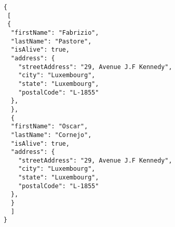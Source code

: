 \begin{minipage}{14cm}
\footnotesize
\begin{lstlisting}[caption=Example JSON file with information about a person., label=JSONfile]
{
 [
 {
  "firstName": "Fabrizio",
  "lastName": "Pastore",
  "isAlive": true,
  "address": {
    "streetAddress": "29, Avenue J.F Kennedy",
    "city": "Luxembourg",
    "state": "Luxembourg",
    "postalCode": "L-1855"
  },
  },
  {
  "firstName": "Oscar",
  "lastName": "Cornejo",
  "isAlive": true,
  "address": {
    "streetAddress": "29, Avenue J.F Kennedy",
    "city": "Luxembourg",
    "state": "Luxembourg",
    "postalCode": "L-1855"
  },
  }
  ]
}
\end{lstlisting}
\end{minipage}
